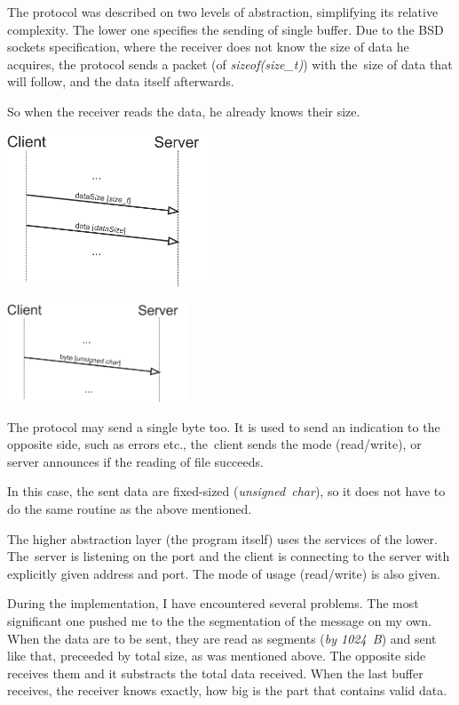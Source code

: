 \documentclass[10pt,a4paper,titlepage]{article}
\begin{document}
\begin{multicols}{2}
The protocol was described on two levels of abstraction, simplifying its
relative complexity. The lower one specifies the sending of single
buffer. Due to the BSD sockets specification, where the receiver
does not know the size of data he acquires, the protocol sends a packet
(of {\it sizeof(size\_t)}) with the~size of data that will follow,
and the data itself afterwards.

So when the receiver reads the data, he already knows their size.

\includegraphics[width=0.45\textwidth]{send_data.png}
\end{multicols}


\begin{multicols}{2}
\includegraphics[width=0.4\textwidth]{send_byte.png}

The protocol may send a single byte too. It is used to send an indication
to the opposite side, such as errors etc., the~client sends the mode
(read/write), or server announces if the reading of file succeeds.

In this case, the sent data are fixed-sized ({\it unsigned~char}),
so it does not have to do the same routine as the above mentioned.
\end{multicols}


The higher abstraction layer (the program itself) uses the services of the
lower. The~server is listening on the port and the client is connecting to the
server with explicitly given address and port. The mode of usage (read/write)
is also given.

During the implementation, I have encountered several problems. The most
significant one pushed me to the the segmentation of the message on my own.
When the data are to be sent, they are read as segments ({\it by 1024~B})
and sent like that, preceeded by total size, as was mentioned above.
The opposite side receives them and it substracts the total data received.
When the last buffer receives, the receiver knows exactly, how big is the
part that contains valid data.
\end{document}

